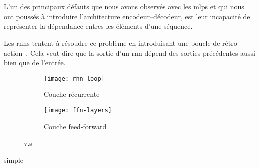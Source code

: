 \section{}
\label{sec.rnn}

L'un des principaux défauts que nous avons observés avec les \glspl{mlp} 
et qui nous ont poussés à introduire l'architecture encodeur--décodeur,
est leur incapacité de représenter la dépendance entres les éléments d'une séquence.

Les \glspl{rnn} tentent à résoudre ce problème en introduisant une boucle de rétro-action~\cite{Fathi_2021}.
Cela veut dire que la sortie d'un \gls{rnn} dépend des sorties précédentes aussi bien que de l'entrée.

\begin{figure}[hbt]
    \begin{center}
        \begin{subfigure}{.4\linewidth}
            \texttt{[image: rnn-loop]}
            \caption{Couche récurrente}
            \label{fig.rnn-loop}
        \end{subfigure}
        \begin{subfigure}{.4\linewidth}
            \texttt{[image: ffn-layers]}
            \caption{Couche feed-forward}
            \label{ffn-layer}
        \end{subfigure}
    \end{center}
    \caption{ v.s }
\end{figure}

{simple}
